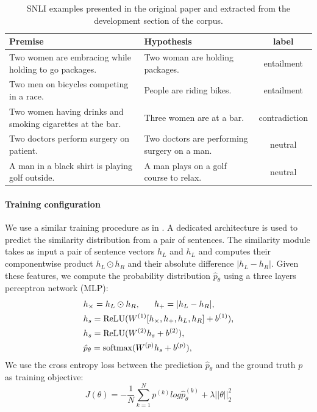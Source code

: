 \begin{table}[!htb]
\centering
\footnotesize
\begin{tabularx}{16cm}{@{}X X c@{} }
  \toprule
Premise & Hypothesis & label \\
\midrule
\midrule 
Two women are embracing while holding to go packages. & Two woman are holding packages. & entailment\\
\rule{0pt}{3ex}Two men on bicycles competing in a race. & People are riding bikes. & entailment\\
\rule{0pt}{3ex}Two women having drinks and smoking cigarettes at the bar. & Three women are at a bar. & contradiction\\
\rule{0pt}{3ex}Two doctors perform surgery on patient. & Two doctors are performing surgery on a man. & neutral\\
\rule{0pt}{3ex}A man in a black shirt is playing golf outside. & A man plays on a golf course to relax. & neutral\\
\bottomrule
\end{tabularx}
\caption{ SNLI examples presented in the original paper \parencite{bowman_15} and extracted from the development section of the corpus.}
\end{table}

\paragraph{Training configuration}

We use a similar training procedure as in \textcite{choi_18}. A dedicated architecture is used to predict the similarity distribution from a pair of sentences. The similarity module takes as input a pair of sentence vectors $h_{L} $ and $h_{L}$ and computes their component\-wise product $h_{L} \odot h_{R}$ and their absolute difference $|h_{L} - h_{R}|$. Given these features, we compute the probability distribution  $\hat{p}_{\theta}$ using a three layers perceptron network (MLP):
\begin{align}
\begin{split}
&h_{\times}=h_L\odot h_R, ~~~~~h_{+} = |h_L - h_R |, \\
&h_s = \operatorname{ReLU}(W^{(1)}[h_{\times}, h_{+}, h_L, h_R] + b^{(1)}), \\
&h_s = \operatorname{ReLU}(W^{(2)}h_s + b^{(2)}), \\
&\hat{p}_{\theta} = \operatorname{softmax}(W^{(p)}h_s + b^{(p)}),\\
\end{split}
\end{align}
We use the cross entropy loss between the prediction $\hat{p}_{\theta}$ and the ground truth $p$ as training objective:
\begin{equation}
J(\theta) = -\frac{1}{N}\sum_{k=1}^{N}p^{(k)} log \hat{p}_{\theta}^{(k)} + \lambda||\theta||_{2}^{2}
\end{equation}

